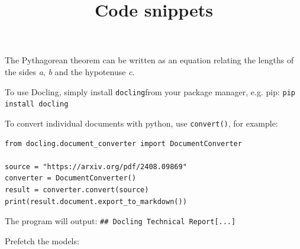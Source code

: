 \documentclass[11pt,a4paper]{article}
\title{Code snippets}
\begin{document}
\maketitle

The Pythagorean theorem can be written as an equation relating the lengths of the sides \textit{a}, \textit{b} and the hypotenuse \textit{c}.

To use Docling, simply install \texttt{docling}from your package manager, e.g. pip: \texttt{pip install docling}

To convert individual documents with python, use \texttt{convert()}, for example:

\begin{verbatim}
from docling.document_converter import DocumentConverter

source = "https://arxiv.org/pdf/2408.09869"
converter = DocumentConverter()
result = converter.convert(source)
print(result.document.export_to_markdown())
\end{verbatim}

The program will output: \texttt{\#\# Docling Technical Report[...]}

Prefetch the models:

\end{document}
